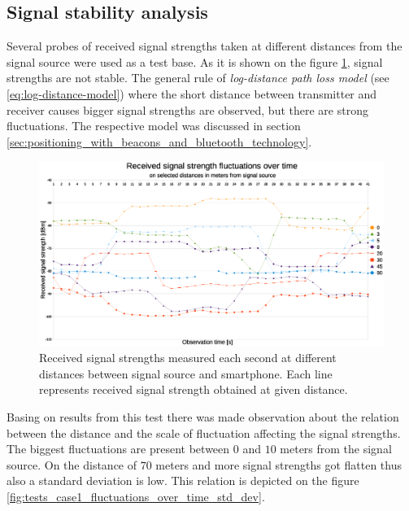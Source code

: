\documentclass[../main.tex]{subfiles}
\begin{document}
\subsection{Signal stability analysis} %
\label{sub:signal_stability_analysis}

Several probes of received signal strengths taken at different distances from the signal source were used as a test base. As it is shown on the figure \ref{fig:tests_case1_fluctuations_over_time}, signal strengths are not stable. The general rule of \textit{log-distance path loss model} (see \ref{eq:log-distance-model}) where the short distance between transmitter and receiver causes bigger signal strengths are observed, but there are strong fluctuations. The respective model was discussed in section \ref{sec:positioning_with_beacons_and_bluetooth_technology}.

\begin{figure}[!htbp]
\includegraphics[width=\textwidth, keepaspectratio]{pictures/tests_case1_fluctuations_over_time}
\centering
\caption{Received signal strengths measured each second at different distances between signal source and smartphone. Each line represents received signal strength obtained at given distance.}
\label{fig:tests_case1_fluctuations_over_time}
\end{figure}

Basing on results from this test there was made observation about the relation between the distance and the scale of fluctuation affecting the signal strengths. The biggest fluctuations are present between $0$ and $10$ meters from the signal source. On the distance of $70$ meters and more signal strengths got flatten thus also a standard deviation is low. This relation is depicted on the figure \ref{fig:tests_case1_fluctuations_over_time_std_dev}.
\end{document}
